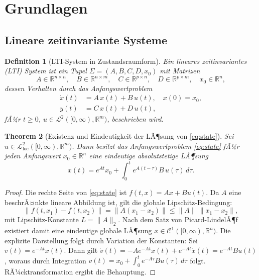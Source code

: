 ﻿\documentclass[12pt,a4paper]{article}
\newtheorem{theorem}{Theorem}[section]
\newtheorem{definition}[theorem]{Definition}
\theoremstyle{definition}
\begin{document}
\section{Grundlagen}
\label{sec:grundlagen}

\subsection{Lineare zeitinvariante Systeme}

\begin{definition}[LTI-System in Zustandsraumform]
\label{def:lti}
Ein \emph{lineares zeitinvariantes} (LTI) System ist ein Tupel
$\Sigma = (A, B, C, D, x_0)$ mit Matrizen
\[
  A \in \mathbb{R}^{n \times n},\quad
  B \in \mathbb{R}^{n \times m},\quad
  C \in \mathbb{R}^{p \times n},\quad
  D \in \mathbb{R}^{p \times m},\quad
  x_0 \in \mathbb{R}^n,
\]
dessen Verhalten durch das Anfangswertproblem
\begin{align}
  \dot{x}(t) &= A\,x(t) + B\,u(t), \quad x(0) = x_0, \label{eq:state}\\
  y(t) &= C\,x(t) + D\,u(t), \label{eq:output}
\end{align}
fÃ¼r $t \geq 0$, $u \in \mathcal{L}^2([0,\infty), \mathbb{R}^m)$, beschrieben wird.
\end{definition}

\begin{theorem}[Existenz und Eindeutigkeit der LÃ¶sung von \eqref{eq:state}]
\label{thm:ex}
Sei $u \in \mathcal{L}^2_{\mathrm{loc}}([0,\infty), \mathbb{R}^m)$. Dann besitzt
das Anfangswertproblem \eqref{eq:state} fÃ¼r jeden Anfangswert $x_0 \in \mathbb{R}^n$
eine eindeutige absolutstetige LÃ¶sung
\[
  x(t) = e^{At} x_0 + \int_0^t e^{A(t-\tau)} B\, u(\tau)\, d\tau.
\]
\end{theorem}

\begin{proof}
Die rechte Seite von \eqref{eq:state} ist $f(t,x) = Ax + Bu(t)$. Da $A$ eine
beschrÃ¤nkte lineare Abbildung ist, gilt die globale Lipschitz-Bedingung:
\[
  \|f(t,x_1) - f(t,x_2)\| = \|A(x_1-x_2)\| \leq \|A\|\,\|x_1-x_2\|,
\]
mit Lipschitz-Konstante $L = \|A\|_2$. Nach dem Satz von Picard-LindelÃ¶f
existiert damit eine eindeutige globale LÃ¶sung $x \in \mathcal{C}^1([0,\infty),
\mathbb{R}^n)$. Die explizite Darstellung folgt durch Variation der Konstanten:
Sei $v(t) = e^{-At} x(t)$. Dann gilt
$\dot{v}(t) = -A e^{-At} x(t) + e^{-At}\dot{x}(t) = e^{-At} Bu(t)$,
woraus durch Integration
$v(t) = x_0 + \int_0^t e^{-A\tau} Bu(\tau)\,d\tau$
folgt. RÃ¼cktransformation ergibt die Behauptung.
\end{proof}
\end{document}
